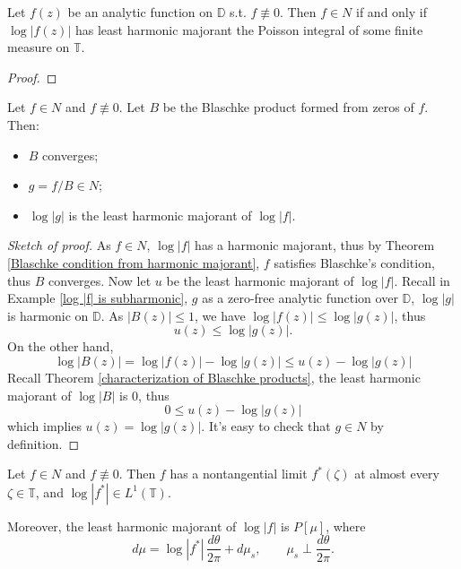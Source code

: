 \begin{theorem}\label{characterization of Nevanlinna using log |f|}
Let $f(z)$ be an analytic function on $\mathbb{D}$ s.t. $f\not\equiv 0$. 
Then $f\in N$ if and only if $\log|f(z)|$ has least harmonic majorant
the Poisson integral of some finite measure on $\mathbb{T}$.
\end{theorem}
\begin{proof}

\end{proof}


\begin{lemma}\label{least harmonic majorant of log|f| for Nevanlinna f}
Let $f\in N$ and $f\not\equiv 0$. Let $B$ be the Blaschke product formed from zeros of $f$. Then:
\begin{itemize}
  \item $B$ converges;
  \item $g=f/B\in N$;
  \item $\log |g|$ is the least harmonic majorant of $\log |f|$.
\end{itemize}
\end{lemma}
\begin{proof}[Sketch of proof]
As $f\in N$, $\log |f|$ has a harmonic majorant, thus by Theorem \ref{Blaschke condition from harmonic majorant},
$f$ satisfies Blaschke's condition, thus $B$ converges. Now let $u$ be the least harmonic majorant
of $\log |f|$. Recall in Example \ref{log |f| is subharmonic}, $g$ as a zero-free analytic function
over $\mathbb{D}$, $\log |g|$ is harmonic on $\mathbb{D}$. As $|B(z)|\leq 1$, we have 
$\log |f(z)|\leq \log |g(z)|$, thus 
\begin{equation*}
  u(z)\leq \log|g(z)|.
\end{equation*}
On the other hand, 
\begin{equation*}
  \log |B(z)|=\log |f(z)|-\log|g(z)|\leq u(z)-\log |g(z)|
\end{equation*}
Recall Theorem \ref{characterization of Blaschke products}, the least harmonic majorant of $\log|B|$
is 0, thus 
\begin{equation*}
  0\leq u(z)-\log|g(z)|
\end{equation*}
which implies $u(z)=\log |g(z)|$. It's easy to check that $g\in N$ by definition.
\end{proof}


\begin{theorem}\label{nontangential limit of Nevanlinna}
Let $f\in N$ and $f\not\equiv 0$. Then $f$ has a nontangential limit $f^*(\zeta)$ at almost
every $\zeta\in\mathbb{T}$, and $\log|f^*|\in L^1(\mathbb{T})$.

Moreover, the least harmonic majorant of $\log|f|$ is $P[\mu]$, where
\begin{equation*}
  d\mu=\log|f^*|\,\frac{d\theta}{2\pi}+d\mu_s,
  \qquad \mu_s\perp\frac{d\theta}{2\pi}.
\end{equation*}
\end{theorem}

